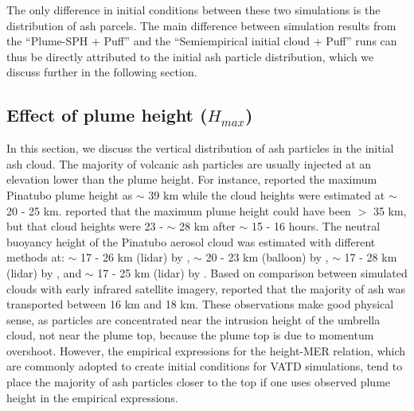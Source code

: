 \documentclass[utf8]{frontiersSCNS} %
\begin{document}
The only difference in initial conditions between these two simulations is the  distribution of ash parcels. The main difference between simulation results from the ``Plume-SPH + Puff'' and the ``Semiempirical initial cloud + Puff'' runs can thus be directly attributed to the initial ash particle distribution, which we discuss further in the following section.

\subsection{Effect of plume height ($H_{max}$)}

In this section, we discuss the vertical distribution of ash particles in the initial ash cloud.
The majority of volcanic ash particles are usually  injected at an elevation lower than the plume height. For instance, \citet{holasek1996satellite, holasek1996experiments} reported the maximum Pinatubo plume height as $\sim$ 39 km while the cloud heights were estimated at $\sim$ 20 - 25 km. \citet{self1993atmospheric} reported that the maximum plume height could have been $>$ 35 km, but that cloud heights were 23 - $\sim$ 28 km after $\sim$ 15 - 16 hours. The neutral buoyancy height of the Pinatubo aerosol cloud was estimated with different methods at: $\sim$ 17 - 26 km (lidar) by \citet{defoor1992early}, $\sim$ 20 - 23 km (balloon) by \citet{deshler1992balloonborne}, $\sim$ 17 - 28 km (lidar) by \citet{jager1992pinatubo}, and $\sim$ 17 - 25 km (lidar) by \citet{avdyushin19931}. Based on comparison between simulated clouds with early infrared satellite imagery, \citet{fero2008simulation} reported that the majority of ash was transported between 16 km and 18 km. These observations make good physical sense, as particles are concentrated near the intrusion height of the umbrella cloud, not near the plume top, because the plume top is due to momentum overshoot. However, the empirical expressions for the height-MER relation, which are commonly adopted to create initial conditions for VATD simulations, tend to place the majority of ash particles closer to the top if one uses observed plume height in the empirical expressions.
\end{document}
